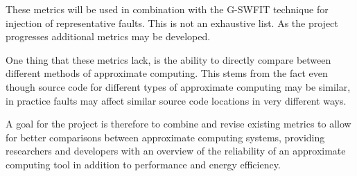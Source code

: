 These metrics will be used in combination with the G-SWFIT technique for injection of representative faults\citep{duraes2006emulation}.
This is not an exhaustive list. As the project progresses additional metrics may be developed.


One thing that these metrics lack, is the ability to directly compare between different methods of approximate computing. This stems from the fact even though source code for different types of approximate computing may be similar, in practice faults may affect similar source code locations in very different ways. 

A goal for the project is therefore to combine and revise existing metrics to allow for better comparisons between approximate computing systems, providing researchers and developers with an overview of the reliability of an approximate computing tool in addition to performance and energy efficiency.  

